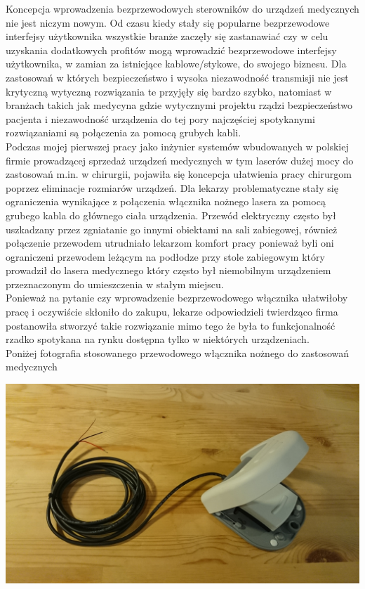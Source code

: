\par 
\tab Koncepcja wprowadzenia bezprzewodowych sterowników do urządzeń medycznych nie jest niczym nowym. Od czasu kiedy stały się popularne bezprzewodowe interfejsy użytkownika wszystkie branże zaczęły się zastanawiać czy w celu uzyskania dodatkowych profitów mogą wprowadzić bezprzewodowe interfejsy użytkownika, w zamian za istniejące kablowe/stykowe, do swojego biznesu. Dla zastosowań w których bezpieczeństwo i wysoka niezawodność transmisji nie jest krytyczną wytyczną rozwiązania te przyjęły się bardzo szybko, natomiast w branżach takich jak medycyna gdzie wytycznymi projektu rządzi bezpieczeństwo pacjenta i niezawodność urządzenia do tej pory najczęściej spotykanymi rozwiązaniami są połączenia za pomocą grubych kabli. \\

\tab Podczas mojej pierwszej pracy jako inżynier systemów wbudowanych w polskiej firmie prowadzącej sprzedaż urządzeń medycznych w tym laserów dużej mocy do zastosowań m.in. w chirurgii, pojawiła się koncepcja ułatwienia pracy chirurgom poprzez eliminacje rozmiarów urządzeń. Dla lekarzy problematyczne stały się ograniczenia wynikające z połączenia włącznika nożnego lasera za pomocą grubego kabla do głównego ciała urządzenia. Przewód elektryczny często był uszkadzany przez zgniatanie go innymi obiektami na sali zabiegowej, również połączenie przewodem utrudniało lekarzom komfort pracy ponieważ byli oni ograniczeni przewodem leżącym na podłodze przy stole zabiegowym który prowadził do lasera medycznego który często był niemobilnym urządzeniem przeznaczonym do umieszczenia w stałym miejscu. \\

\tab Ponieważ na pytanie czy wprowadzenie bezprzewodowego włącznika ułatwiłoby pracę i oczywiście skłoniło do zakupu, lekarze odpowiedzieli twierdząco firma postanowiła stworzyć takie rozwiązanie mimo tego że była to funkcjonalność rzadko spotykana na rynku dostępna tylko w niektórych urządzeniach. \\

Poniżej fotografia stosowanego przewodowego włącznika nożnego do zastosowań medycznych

 \centerline{\includegraphics[scale=0.10]{./img/target_system/wlacznik_nozny.jpg}}


